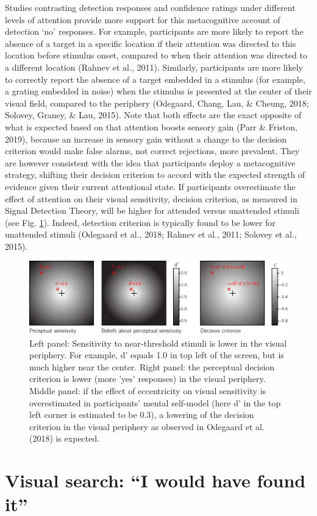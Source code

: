 \documentclass[12pt,twoside]{reedthesis}
\begin{document}
Studies contrasting detection responses and confidence ratings under different levels of attention provide more support for this metacognitive account of detection `no' responses. For example, participants are more likely to report the absence of a target in a specific location if their attention was directed to this location before stimulus onset, compared to when their attention was directed to a different location (Rahnev et al., 2011). Similarly, participants are more likely to correctly report the absence of a target embedded in a stimulus (for example, a grating embedded in noise) when the stimulus is presented at the center of their visual field, compared to the periphery (Odegaard, Chang, Lau, \& Cheung, 2018; Solovey, Graney, \& Lau, 2015). Note that both effects are the exact opposite of what is expected based on that attention boosts sensory gain (Parr \& Friston, 2019), because an increase in sensory gain without a change to the decision criterion would make false alarms, not correct rejections, more prevalent. They are however consistent with the idea that participants deploy a metacognitive strategy, shifting their decision criterion to accord with the expected strength of evidence given their current attentional state. If participants overestimate the effect of attention on their visual sensitivity, decision criterion, as measured in Signal Detection Theory, will be higher for attended versus unattended stimuli (see Fig. \ref{fig:intro-detection}). Indeed, detection criterion is typically found to be lower for unattended stimuli (Odegaard et al., 2018; Rahnev et al., 2011; Solovey et al., 2015).
\begin{figure}
\includegraphics[width=1\linewidth]{figure/intro/detection} \caption[The effect of erroneous beliefs about perceptual sensitivity on decision criterion]{Left panel: Sensitivity to near-threshold stimuli is lower in the visual periphery. For example, d' equals 1.0 in top left of the screen, but is much higher near the center. Right panel: the perceptual decision criterion is lower (more 'yes' responses) in the visual periphery.  Middle panel: if the effect of eccentricity on visual sensitivity is overestimated in participants' mental self-model (here d' in the top left corner is estimated to be 0.3), a lowering of the decision criterion in the visual periphery as observed in Odegaard et al. (2018) is expected.}\label{fig:intro-detection}
\end{figure}
\hypertarget{intro:search}{%
\section{Visual search: ``I would have found it''}\label{intro:search}}
\end{document}
